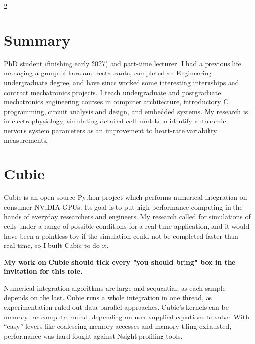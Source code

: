 \documentclass[10pt,a4paper]{article}
\begin{document}
\begin{paracol}{2}
\vspace*{-\colheadshift}
\section{Summary}
PhD student (finishing early 2027) and part-time lecturer. I had a previous
life managing a group of bars and restaurants, completed an Engineering
undergraduate degree, and have since worked some interesting internships and contract
mechatronics projects. I teach undergraduate and postgraduate mechatronics engineering
courses in computer architecture, introductory C programming, circuit analysis and design, and embedded systems.
My research is in electrophysiology, simulating detailed cell
models to identify autonomic nervous system parameters as an improvement to
heart-rate variability measurements.

\section{Cubie}
Cubie is an open-source Python project which performs numerical integration on consumer NVIDIA GPUs.
Its goal is to put high-performance computing in the hands of everyday researchers and engineers.
My research called for simulations of cells under a range of possible conditions for a real-time application, 
and it would have been a pointless toy if the simulation could not be completed faster than real-time, so I built Cubie to do it.

\textbf{My work on Cubie should tick every "you should bring" box in the invitation for this role.}

Numerical integration algorithms are large and sequential, as each sample depends on the last.
Cubie runs a whole integration in one thread, as experimentation ruled out data-parallel approaches.
Cubie's kernels can be memory- or compute-bound, depending on user-supplied equations to solve.
With ``easy'' levers like coalescing memory accesses and memory tiling exhausted, performance
was hard-fought against Nsight profiling tools.


\end{paracol}
\end{document}
